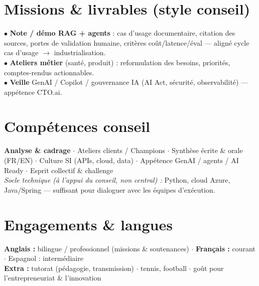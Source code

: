 \documentclass[letterpaper,10.5pt]{article}
\begin{document}
\section{Missions \& livrables (style conseil)}
\small{
$\bullet$ \textbf{Note / d\'emo RAG + agents} : cas d'usage documentaire, citation des sources, portes de validation humaine, crit\`eres co\^ut/latence/\'eval --- align\'e cycle \guillemotleft{}cas d'usage $\rightarrow$ industrialisation\guillemotright{}. \\
$\bullet$ \textbf{Ateliers m\'etier} (sant\'e, produit) : reformulation des besoins, priorit\'es, comptes-rendus actionnables. \\
$\bullet$ \textbf{Veille} GenAI / Copilot / gouvernance IA (AI Act, s\'ecurit\'e, observabilit\'e) --- app\'etence CTO.ai.
}
\section{Comp\'etences conseil}
\small{\textbf{Analyse \& cadrage} $\cdot$ Ateliers clients / Champions $\cdot$ Synth\`ese \'ecrite \& orale (FR/EN) $\cdot$ Culture SI (APIs, cloud, data) $\cdot$ App\'etence GenAI / agents / AI Ready $\cdot$ Esprit collectif \& challenge \\
\textit{Socle technique (\`a l'appui du conseil, non central) :} Python, cloud Azure, Java/Spring --- suffisant pour dialoguer avec les \'equipes d'ex\'ecution.}
\section{Engagements \& langues}
\small{\textbf{Anglais :} bilingue / professionnel (missions \& soutenances) $\cdot$ \textbf{Fran\c{c}ais :} courant $\cdot$ Espagnol : interm\'ediaire \\
\textbf{Extra :} tutorat (p\'edagogie, transmission) $\cdot$ tennis, football $\cdot$ go\^ut pour l'entrepreneuriat \& l'innovation}
\end{document}
